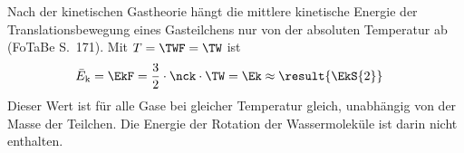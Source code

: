 Nach der kinetischen Gastheorie hängt die mittlere kinetische Energie der Translationsbewegung eines Gasteilchens nur von der absoluten Temperatur ab (FoTaBe S.~171). Mit $T = \TWF = \TW$ ist
\begin{align}
 \bar E_\text{k} &= \EkF = \frac{3}{2}\cdot\nck\cdot\TW = \Ek \approx \result{\EkS{2}}
\end{align}
Dieser Wert ist für alle Gase bei gleicher Temperatur gleich, unabhängig von der Masse der Teilchen. Die Energie der Rotation der Wassermoleküle ist darin nicht enthalten.
